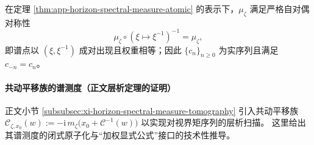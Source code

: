 \begin{corollary}\label{cor:app-horizon-ramanujan-selfdual-measure}
在定理 \ref{thm:app-horizon-spectral-measure-atomic} 的表示下，\(\mu_{\zeta}\) 满足严格自对偶对称性
\[
\mu_{\zeta}\circ(\xi\mapsto \xi^{-1})^{-1}=\mu_{\zeta},
\]
即谱点以 \((\xi,\xi^{-1})\) 成对出现且权重相等；因此 \(\{c_n\}_{n\ge 0}\) 为实序列且满足 \(c_{-n}=c_n\)。
\end{corollary}

\paragraph{共动平移族的谱测度（正文层析定理的证明）}\label{par:app-horizon-comoving-spectral-measure}
正文小节 \ref{subsubsec:xi-horizon-spectral-measure-tomography} 引入共动平移族
\(
\mathscr{C}_{\zeta,x_0}(w):=-\mathrm{i}\,m_{\zeta}\!\bigl(x_0+\mathcal{C}^{-1}(w)\bigr)
\)
以实现对视界矩序列的层析扫描。
这里给出其谱测度的闭式原子化与“加权显式公式”接口的技术性推导。

